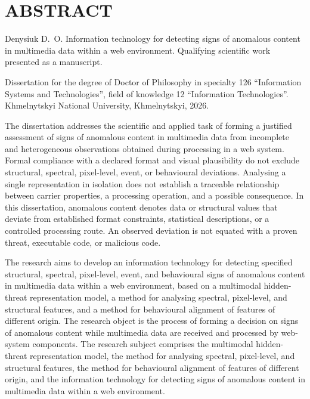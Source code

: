 \chapter*{ABSTRACT}
{}

Denysiuk D.~O. Information technology for detecting signs of anomalous content in multimedia data within a web environment. Qualifying scientific work presented as a manuscript.

Dissertation for the degree of Doctor of Philosophy in specialty 126 ``Information Systems and Technologies'', field of knowledge 12 ``Information Technologies''. Khmelnytskyi National University, Khmelnytskyi, 2026.

The dissertation addresses the scientific and applied task of forming a justified assessment of signs of anomalous content in multimedia data from incomplete and heterogeneous observations obtained during processing in a web system. Formal compliance with a declared format and visual plausibility do not exclude structural, spectral, pixel-level, event, or behavioural deviations. Analysing a single representation in isolation does not establish a traceable relationship between carrier properties, a processing operation, and a possible consequence. In this dissertation, anomalous content denotes data or structural values that deviate from established format constraints, statistical descriptions, or a controlled processing route. An observed deviation is not equated with a proven threat, executable code, or malicious code.

The research aims to develop an information technology for detecting specified structural, spectral, pixel-level, event, and behavioural signs of anomalous content in multimedia data within a web environment, based on a multimodal hidden-threat representation model, a method for analysing spectral, pixel-level, and structural features, and a method for behavioural alignment of features of different origin. The research object is the process of forming a decision on signs of anomalous content while multimedia data are received and processed by web-system components. The research subject comprises the multimodal hidden-threat representation model, the method for analysing spectral, pixel-level, and structural features, the method for behavioural alignment of features of different origin, and the information technology for detecting signs of anomalous content in multimedia data within a web environment.

